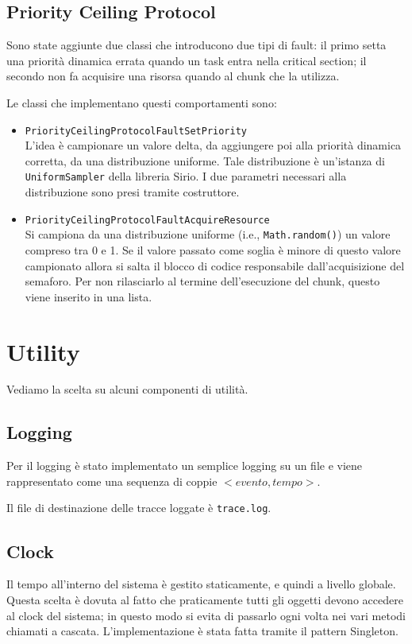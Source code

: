 \subsection{Priority Ceiling Protocol}
Sono state aggiunte due classi che introducono due tipi di fault: il primo setta una priorità dinamica errata quando un task entra nella critical section; il secondo non fa acquisire una risorsa quando al chunk che la utilizza.

\myskip

Le classi che implementano questi comportamenti sono:
\begin{itemize}
    \item \texttt{PriorityCeilingProtocolFaultSetPriority} \\
        L'idea è campionare un valore delta, da aggiungere poi alla priorità dinamica corretta, da una distribuzione uniforme. Tale distribuzione è un'istanza di \texttt{UniformSampler} della libreria Sirio. I due parametri necessari alla distribuzione sono presi tramite costruttore.
    \item \texttt{PriorityCeilingProtocolFaultAcquireResource} \\
        Si campiona da una distribuzione uniforme (i.e., \texttt{Math.random()}) un valore compreso tra 0 e 1. Se il valore passato come soglia è minore di questo valore campionato allora si salta il blocco di codice responsabile dall'acquisizione del semaforo. Per non rilasciarlo al termine dell'esecuzione del chunk, questo viene inserito in una lista.
\end{itemize}

\section{Utility}
Vediamo la scelta su alcuni componenti di utilità.

\subsection{Logging}
Per il logging è stato implementato un semplice logging su un file e viene rappresentato come una sequenza di coppie $<evento,tempo>$.

Il file di destinazione delle tracce loggate è \texttt{trace.log}.

\subsection{Clock}
\label{subsec:clock}
Il tempo all'interno del sistema è gestito staticamente, e quindi a livello globale. Questa scelta è dovuta al fatto che praticamente tutti gli oggetti devono accedere al clock del sistema; in questo modo si evita di passarlo ogni volta nei vari metodi chiamati a cascata. L'implementazione è stata fatta tramite il pattern Singleton.

